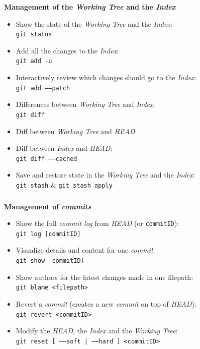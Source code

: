 \begin{frame}
  \frametitle{\insertsubsection}

  \textbf{Management of the \textit{Working Tree} and the \textit{Index}}
  \begin{itemize}
  \item Show the state of the \textit{Working Tree} and the \textit{Index}:\\
    \texttt{git status}
    \vspacing

  \item Add all the changes to the \textit{Index}:\\
    \texttt{git add -u}
    \vspacing

  \item Interactively review which changes
    should go to the \textit{Index}:\\
    \texttt{git add \---\---patch} \vspacing

  \item Differences between \textit{Working Tree} and
    \textit{Index}:\\
    \texttt{git diff}
    \vspacing
  \item Diff between \textit{Working Tree} and \textit{HEAD} \vspacing
  \item Diff between \textit{Index} and \textit{HEAD}:\\
    \texttt{git diff \---\---cached}
    \vspacing

  \item Save and restore state in the \textit{Working Tree} and the
    \textit{Index}:\\
    \texttt{git stash} \& \texttt{git stash apply}
    \vspacing
  \end{itemize}
\end{frame}

\begin{frame}[fragile]
  \frametitle{\insertsubsection}

  \textbf{Management of \textit{commits}} \\
  \begin{itemize}
  \item Show the full \textit{commit log} from
    \textit{HEAD} (or \texttt{commitID}):\\
    \texttt{git log [commitID]} \vspacing
  \item Visualize details and content for one \textit{commit}:\\
    \texttt{git show [commitID]} \vspacing
  \item Show authors for the latest changes made in one filepath:\\
    \texttt{git blame <filepath>}
    \vspacing
  \item Revert a \textit{commit} (creates a new \textit{commit} on top
    of \textit{HEAD}):\\
    \texttt{git revert <commitID>} \vspacing
  \item Modify the \textit{HEAD}, the \textit{Index}
    and the \textit{Working Tree}:\\
    \texttt{git reset [ \---\---soft | \---\---hard ] <commitID>}
    \vspacing
  \end{itemize}
\end{frame}

